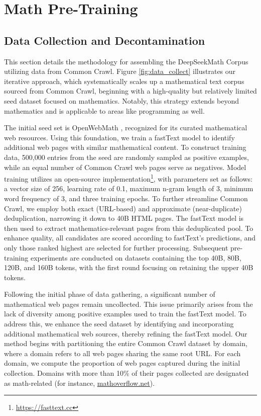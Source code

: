 \section{Math Pre-Training}

\subsection{Data Collection and Decontamination} 
This section details the methodology for assembling the DeepSeekMath Corpus utilizing data from Common Crawl. Figure \ref{fig:data_collect} illustrates our iterative approach, which systematically scales up a mathematical text corpus sourced from Common Crawl, beginning with a high-quality but relatively limited seed dataset focused on mathematics. Notably, this strategy extends beyond mathematics and is applicable to areas like programming as well.

The initial seed set is OpenWebMath \citep{openwebmath}, recognized for its curated mathematical web resources. Using this foundation, we train a fastText model \citep{joulin2016fasttext} to identify additional web pages with similar mathematical content. To construct training data, 500,000 entries from the seed are randomly sampled as positive examples, while an equal number of Common Crawl web pages serve as negatives. Model training utilizes an open-source implementation\footnote{\url{https://fasttext.cc}}, with parameters set as follows: a vector size of 256, learning rate of 0.1, maximum n-gram length of 3, minimum word frequency of 3, and three training epochs. To further streamline Common Crawl, we employ both exact (URL-based) and approximate (near-duplicate) deduplication, narrowing it down to 40B HTML pages. The fastText model is then used to extract mathematics-relevant pages from this deduplicated pool. To enhance quality, all candidates are scored according to fastText’s predictions, and only those ranked highest are selected for further processing. Subsequent pre-training experiments are conducted on datasets containing the top 40B, 80B, 120B, and 160B tokens, with the first round focusing on retaining the upper 40B tokens.

Following the initial phase of data gathering, a significant number of mathematical web pages remain uncollected. This issue primarily arises from the lack of diversity among positive examples used to train the fastText model. To address this, we enhance the seed dataset by identifying and incorporating additional mathematical web sources, thereby refining the fastText model. Our method begins with partitioning the entire Common Crawl dataset by domain, where a domain refers to all web pages sharing the same root URL. For each domain, we compute the proportion of web pages captured during the initial collection. Domains with more than 10\% of their pages collected are designated as math-related (for instance, \url{mathoverflow.net}).

